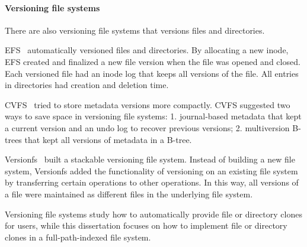 \paragraph{Versioning file systems}

There are also versioning file systems that versions files and directories.

EFS~\citep{efs} automatically versioned files and directories.
By allocating a new inode, EFS created and finalized a new file version when the
file was opened and closed.
Each versioned file had an inode log that keeps all versions of the file.
All entries in directories had creation and deletion time.

CVFS~\citep{cvfs} tried to store metadata versions more compactly.
CVFS suggested two ways to save space in versioning file systems:
1. journal-based metadata that kept a current version and an undo log to
recover previous versions;
2. multiversion B-trees that kept all versions of metadata in a B-tree.

Versionfs~\citep{versionfs} built a stackable versioning file system.
Instead of building a new file system, Versionfs added the functionality of
versioning on an existing file system by transferring certain operations to
other operations.
In this way, all versions of a file were maintained as different files in the
underlying file system.

Versioning file systems study how to automatically provide file or directory
clones for users,
while this dissertation focuses on how to implement file or directory clones
in a full-path-indexed file system.

